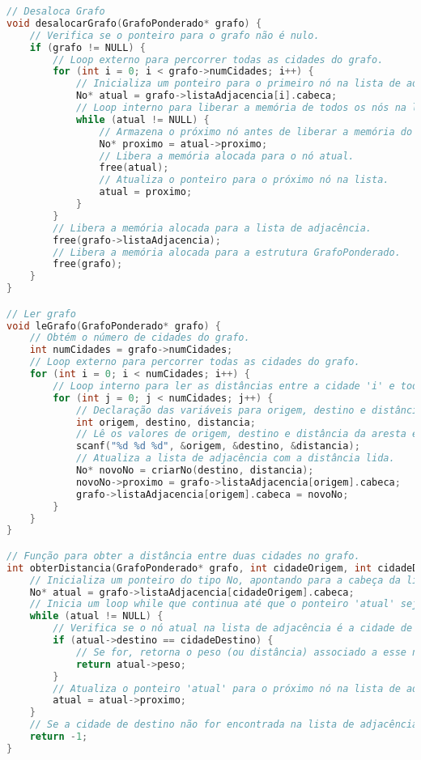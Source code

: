 \documentclass{article}
\begin{document}
\begin{lstlisting}[caption={grafo.c},label={lst:cod1},language=C]
// Desaloca Grafo
void desalocarGrafo(GrafoPonderado* grafo) {
    // Verifica se o ponteiro para o grafo não é nulo.
    if (grafo != NULL) {
        // Loop externo para percorrer todas as cidades do grafo.
        for (int i = 0; i < grafo->numCidades; i++) {
            // Inicializa um ponteiro para o primeiro nó na lista de adjacência da cidade atual.
            No* atual = grafo->listaAdjacencia[i].cabeca;
            // Loop interno para liberar a memória de todos os nós na lista de adjacência da cidade atual.
            while (atual != NULL) {
                // Armazena o próximo nó antes de liberar a memória do nó atual.
                No* proximo = atual->proximo;
                // Libera a memória alocada para o nó atual.
                free(atual);
                // Atualiza o ponteiro para o próximo nó na lista.
                atual = proximo;
            }
        }
        // Libera a memória alocada para a lista de adjacência.
        free(grafo->listaAdjacencia);
        // Libera a memória alocada para a estrutura GrafoPonderado.
        free(grafo);
    }
}

// Ler grafo
void leGrafo(GrafoPonderado* grafo) {
    // Obtém o número de cidades do grafo.
    int numCidades = grafo->numCidades;
    // Loop externo para percorrer todas as cidades do grafo.
    for (int i = 0; i < numCidades; i++) {
        // Loop interno para ler as distâncias entre a cidade 'i' e todas as outras cidades.
        for (int j = 0; j < numCidades; j++) {
            // Declaração das variáveis para origem, destino e distância entre as cidades.
            int origem, destino, distancia;
            // Lê os valores de origem, destino e distância da aresta entre as cidades.
            scanf("%d %d %d", &origem, &destino, &distancia);
            // Atualiza a lista de adjacência com a distância lida.
            No* novoNo = criarNo(destino, distancia);
            novoNo->proximo = grafo->listaAdjacencia[origem].cabeca;
            grafo->listaAdjacencia[origem].cabeca = novoNo;
        }
    }
}

// Função para obter a distância entre duas cidades no grafo.
int obterDistancia(GrafoPonderado* grafo, int cidadeOrigem, int cidadeDestino) {
    // Inicializa um ponteiro do tipo No, apontando para a cabeça da lista de adjacência da cidade de origem no grafo.
    No* atual = grafo->listaAdjacencia[cidadeOrigem].cabeca;
    // Inicia um loop while que continua até que o ponteiro 'atual' seja NULL, indicando o fim da lista.
    while (atual != NULL) {
        // Verifica se o nó atual na lista de adjacência é a cidade de destino.
        if (atual->destino == cidadeDestino) {
            // Se for, retorna o peso (ou distância) associado a esse nó, que é a distância até a cidade de destino.
            return atual->peso;
        }
        // Atualiza o ponteiro 'atual' para o próximo nó na lista de adjacência.
        atual = atual->proximo;
    }
    // Se a cidade de destino não for encontrada na lista de adjacência da cidade de origem, retorna -1.
    return -1;
}


\end{lstlisting}
\end{document}
